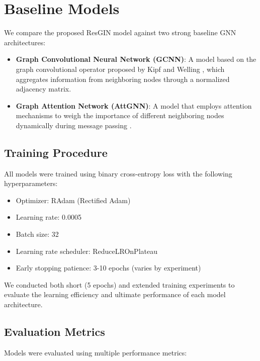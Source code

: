 \documentclass[conference]{IEEEtran}
\begin{document}
\section{Baseline Models}
We compare the proposed ResGIN model against two strong baseline GNN architectures:

\begin{itemize}
    \item \textbf{Graph Convolutional Neural Network (GCNN)}: A model based on the graph convolutional operator proposed by Kipf and Welling \cite{kipf2017semi}, which aggregates information from neighboring nodes through a normalized adjacency matrix.
    
    \item \textbf{Graph Attention Network (AttGNN)}: A model that employs attention mechanisms to weigh the importance of different neighboring nodes dynamically during message passing \cite{velivckovic2018graph}.
\end{itemize}

\subsection{Training Procedure}
All models were trained using binary cross-entropy loss with the following hyperparameters:

\begin{itemize}
    \item Optimizer: RAdam (Rectified Adam) \cite{liu2019variance}
    \item Learning rate: 0.0005
    \item Batch size: 32
    \item Learning rate scheduler: ReduceLROnPlateau
    \item Early stopping patience: 3-10 epochs (varies by experiment)
\end{itemize}

We conducted both short (5 epochs) and extended training experiments to evaluate the learning efficiency and ultimate performance of each model architecture.

\subsection{Evaluation Metrics}
Models were evaluated using multiple performance metrics:
\end{document}
